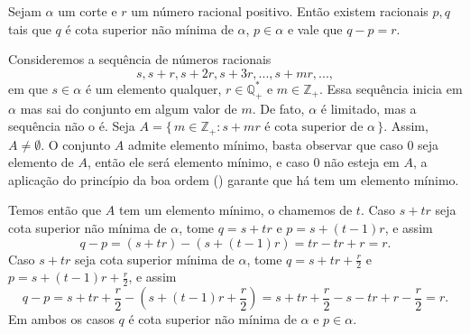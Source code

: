 \documentclass[../main.tex]{subfiles}
\begin{document}
\begin{lema}\label{reais-lema-pqNaoMinimo}
    Sejam $\alpha$ um corte e $r$ um número racional positivo. Então existem racionais $p,q$ tais que $q$ é cota superior não mínima de $\alpha$, $p \in \alpha$ e vale que $q-p = r$.
\end{lema}
\begin{dem}
    Consideremos a sequência de números racionais 
    \[ s, s+r, s+2r, s+3r, ..., s+mr, ...,\] 
    em que $s \in \alpha$ é um elemento qualquer, $r \in \mathbb{Q}_{+}^*$ e $m \in \mathbb{Z}_{+}$. Essa sequência inicia em $\alpha$ mas sai do conjunto em algum valor de $m$. De fato, $\alpha$ é limitado, mas a sequência não o é. Seja $A = \{\,m \in \mathbb{Z}_{+} : s+mr \text{ é cota superior de } \alpha \,\}$. Assim, $A \neq \emptyset$. O conjunto $A$ admite elemento mínimo, basta observar que caso $0$ seja elemento de $A$, então ele será elemento mínimo, e caso $0$ não esteja em $A$, a aplicação do princípio da boa ordem () garante que há tem um elemento mínimo.

    Temos então que $A$ tem um elemento mínimo, o chamemos de $t$. Caso $s+tr$ seja cota superior não mínima de $\alpha$, tome $q = s+tr$ e $p = s+(t-1)r$, e assim 
    \[ q-p =  (s+tr) - (s+(t-1)r) = tr -tr + r = r. \]
    Caso $s+tr$ seja cota superior mínima de $\alpha$, tome $q = s+tr+\frac{r}{2}$ e $p = s+(t-1)r+\frac{r}{2}$, e assim 
    \[ q - p = s+tr+\frac{r}{2} - \left(s+(t-1)r+\frac{r}{2}\right) = s + tr + \frac{r}{2} - s - tr + r - \frac{r}{2} = r. \]
    Em ambos os casos $q$ é cota superior não mínima de $\alpha$ e $p \in \alpha$. 
\end{dem}
\end{document}
